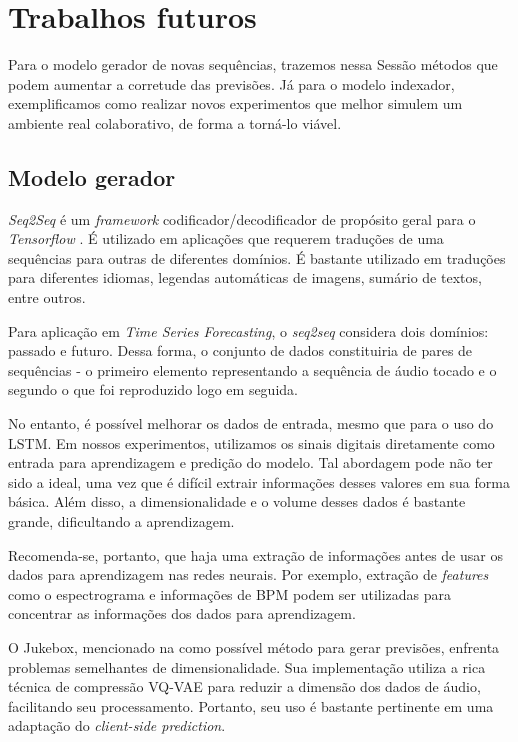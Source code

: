 \section{Trabalhos futuros}
\label{sec:later_work}

Para o modelo gerador de novas sequências, trazemos nessa Sessão métodos que podem aumentar a corretude das previsões. Já para o modelo indexador, exemplificamos como realizar novos experimentos que melhor simulem um ambiente real colaborativo, de forma a torná-lo viável.

\subsection{Modelo gerador}

\textit{Seq2Seq} é um \textit{framework} codificador/decodificador de propósito geral para o \textit{Tensorflow} \cite{seq2seq}. É utilizado em aplicações que requerem traduções de uma sequências para outras de diferentes domínios. É bastante utilizado em traduções para diferentes idiomas, legendas automáticas de imagens, sumário de textos, entre outros.

Para aplicação em \textit{Time Series Forecasting}, o \textit{seq2seq} considera dois domínios: passado e futuro. Dessa forma, o conjunto de dados constituiria de pares de sequências - o primeiro elemento representando a sequência de áudio tocado e o segundo o que foi reproduzido logo em seguida.

No entanto, é possível melhorar os dados de entrada, mesmo que para o uso do LSTM. Em nossos experimentos, utilizamos os sinais digitais diretamente como entrada para aprendizagem e predição do modelo. Tal abordagem pode não ter sido a ideal, uma vez que é difícil extrair informações desses valores em sua forma básica. Além disso, a dimensionalidade e o volume desses dados é bastante grande, dificultando a aprendizagem.

Recomenda-se, portanto, que haja uma extração de informações antes de usar os dados para aprendizagem nas redes neurais. Por exemplo, extração de \textit{features} como o espectrograma e informações de BPM podem ser utilizadas para concentrar as informações dos dados para aprendizagem.

O Jukebox, mencionado na  como possível método para gerar previsões, enfrenta problemas semelhantes de dimensionalidade. Sua implementação utiliza a rica técnica de compressão VQ-VAE \cite{vq-vae} para reduzir a dimensão dos dados de áudio, facilitando seu processamento. Portanto, seu uso é bastante pertinente em uma adaptação do \textit{client-side prediction}.

